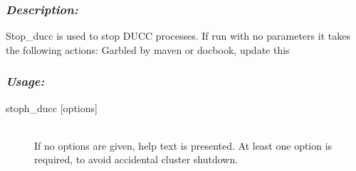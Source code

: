     \subsubsection{{\em Description:}}
    Stop\_ducc is used to stop DUCC processes. If run with no parameters it takes the following 
    actions:
    \todo Garbled by maven or docbook, update this

    \subsubsection{\em Usage:}

    \begin{description}
      \item[stoph\_ducc {[options]}] \hfill \\ 
        If no options are given, help text is presented. At least one option is required, to avoid 
        accidental cluster shutdown. 
      \end{description}
    

